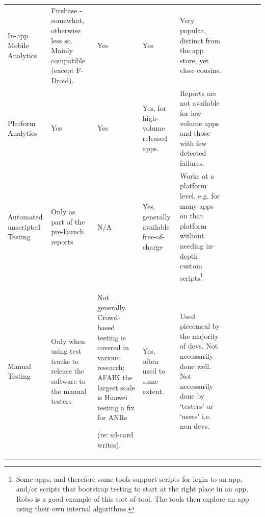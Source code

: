 \begin{table}[H]
\begin{adjustbox}{max width=\textwidth}
\begin{tabular}{p{2.7cm}p{3.12cm}p{3.7cm}p{3.17cm}p{3.17cm}p{2.7cm}p{3.12cm}p{3.7cm}p{3.17cm}p{3.17cm}}
\multicolumn{1}{p{2.7cm}}{\raggedright{\scriptsize In-app Mobile Analytics}} & 
\multicolumn{1}{p{3.12cm}}{\raggedright{\scriptsize Firebase - somewhat, otherwise less so. Mainly compatible (except F-Droid).}} & 
\multicolumn{1}{p{3.7cm}}{\raggedright{\scriptsize Yes}} & 
\multicolumn{1}{p{3.17cm}}{\raggedright{\scriptsize Yes}} & 
\multicolumn{1}{p{3.17cm}}{\raggedright{\scriptsize Very popular, distinct from the app store, yet close cousins.}} \\ 

\multicolumn{1}{p{2.7cm}}{\raggedright{\scriptsize Platform Analytics}} & 
\multicolumn{1}{p{3.12cm}}{\raggedright{\scriptsize Yes}} & 
\multicolumn{1}{p{3.7cm}}{\raggedright{\scriptsize Yes}} & 
\multicolumn{1}{p{3.17cm}}{\raggedright{\scriptsize Yes, for high-volume released apps.}} & 
\multicolumn{1}{p{3.17cm}}{\raggedright{\scriptsize Reports are not available for low volume apps and those with few detected failures. }} \\ 

\multicolumn{1}{p{2.7cm}}{\raggedright{\scriptsize Automated unscripted Testing}} & 
\multicolumn{1}{p{3.12cm}}{\raggedright{\scriptsize Only as part of the pre-launch reports}} & 
\multicolumn{1}{p{3.7cm}}{\raggedright{\scriptsize N/A}} & 
\multicolumn{1}{p{3.17cm}}{\raggedright{\scriptsize Yes, generally available free-of-charge}} & 
\multicolumn{1}{p{3.17cm}}{\raggedright{\scriptsize Works at a platform level, e.g. for many apps on that platform without needing in-depth custom scripts\footnote{ Some apps, and therefore some tools support scripts for login to an app, and/or scripts that bootstrap testing to start at the right place in an app. Robo is a good example of this sort of tool. The tools then explore an app using their own internal algorithms.}\par}} \\ 

\multicolumn{1}{p{2.7cm}}{\raggedright{\scriptsize Manual Testing}} & 
\multicolumn{1}{p{3.12cm}}{\raggedright{\scriptsize Only when using test tracks to release the software to the manual testers}} & 
\multicolumn{1}{p{3.7cm}}{\raggedright{\scriptsize Not generally. Crowd-based testing is covered in various research; AFAIK the largest scale is Huawei testing a fix for ANRs \par}

\raggedright{\scriptsize (re: sd-card writes).}} & 
\multicolumn{1}{p{3.17cm}}{\raggedright{\scriptsize Yes, often used to some extent.}} & 
\multicolumn{1}{p{3.17cm}}{\raggedright{\scriptsize Used piecemeal by the majority of devs. Not necessarily done well. Not necessarily done by ‘testers’ or ‘users’ i.e. non devs.\par}} \\ 


\end{tabular}
\end{adjustbox}
\end{table}
